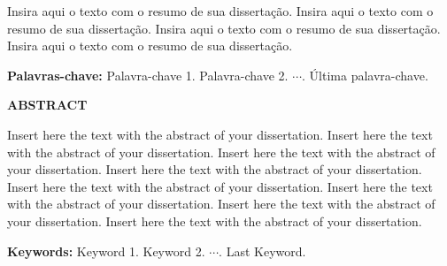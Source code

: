 \documentclass[a4paper,12pt]{report}%
\begin{document}
Insira aqui o texto com o resumo de sua dissertação. Insira aqui o texto com o resumo de sua dissertação. Insira aqui o texto com o resumo de sua dissertação. Insira aqui o texto com o resumo de sua dissertação. 

\vspace{1.5cm} \noindent
{\bf Palavras-chave:} Palavra-chave 1. Palavra-chave 2. $\cdots$. Última palavra-chave.

\newpage

%
%

\thispagestyle{empty}

\begin{center}
  {\normalsize \textnormal{\textbf{ABSTRACT}} }
\end{center}

Insert here the text with the abstract of your dissertation. Insert here the text with the abstract of your dissertation. Insert here the text with the abstract of your dissertation. Insert here the text with the abstract of your dissertation. Insert here the text with the abstract of your dissertation. Insert here the text with the abstract of your dissertation. Insert here the text with the abstract of your dissertation. Insert here the text with the abstract of your dissertation.

\vspace{1.5cm} \noindent
{\bf Keywords:} Keyword 1. Keyword 2. $\cdots$. Last Keyword.

\newpage

%
%


%
%

\listoffigures\thispagestyle{empty}

\newpage 

%
%

\listoftables\thispagestyle{empty}

\newpage 

%
%

\listofTtables\thispagestyle{empty}
\end{document}
